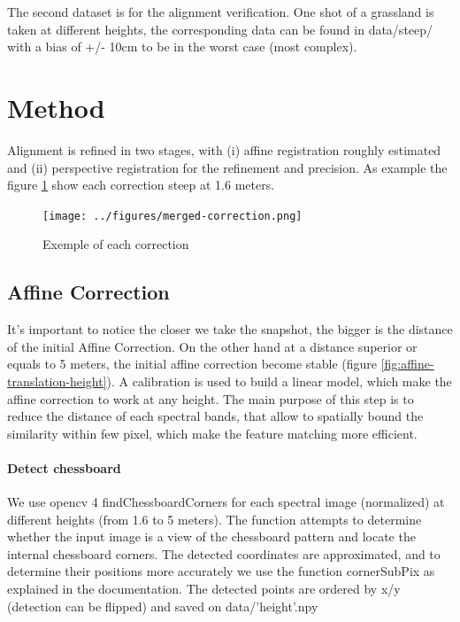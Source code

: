 \documentclass[]{elsarticle}
\begin{document}
	The second dataset is for the alignment verification. One shot of a grassland is taken at different heights, the corresponding data can be found in data/steep/
	with a bias of +/- 10cm to be in the worst case (most complex).
	
	\newpage
	\section{Method}
	
	Alignment is refined in two stages, with
	(i) affine registration roughly estimated
	and (ii) perspective registration for the refinement and precision.
	As example the figure \ref{fig:merged-correction} show each correction steep at 1.6 meters.
	
	\begin{figure}[!htb]
		\centering
		\texttt{[image: ../figures/merged-correction.png]}
		\caption{Exemple of each correction}
		\label{fig:merged-correction}
	\end{figure}
	
	\subsection{Affine Correction}
	
	It's important to notice the closer we take the snapshot, the bigger is the distance of the initial Affine Correction.
	On the other hand at a distance superior or equals to 5 meters, the initial affine correction become stable (figure \ref{fig:affine-translation-height}).
	A calibration is used to build a linear model, which make the affine correction to work at any height.
	The main purpose of this step is to reduce the distance of each spectral bands,
	that allow to spatially bound the similarity within few pixel, which make the feature matching more efficient.
	
	\paragraph{Detect chessboard} We use opencv 4 findChessboardCorners for each spectral image (normalized) at different heights (from 1.6 to 5 meters).
	The function attempts to determine whether the input image is a view of the chessboard pattern and locate the internal chessboard corners.
	The detected coordinates are approximated, and to determine their positions more accurately we use the function cornerSubPix as explained in the documentation.
	The detected points are ordered by x/y (detection can be flipped) and saved on data/'height'.npy
	
\end{document}
